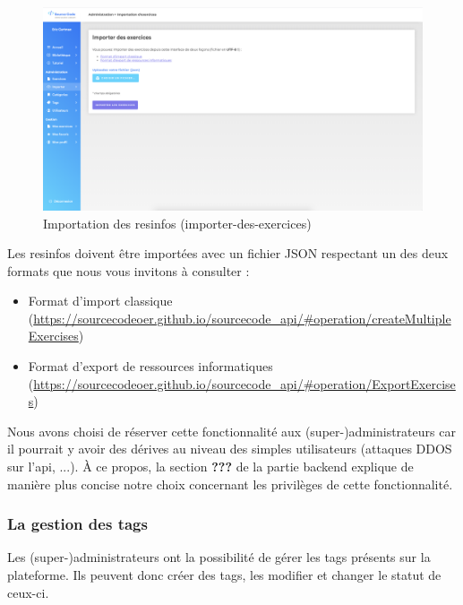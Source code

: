 \begin{figure}[H]
    \includegraphics[width=\textwidth,height=\textheight,keepaspectratio]{images/client/import.png}
    \centering
    \caption[SourceCode : importation des \glspl{resinfo}]{Importation des \glspl{resinfo} (importer-des-exercices)}
\end{figure}

Les \glspl{resinfo} doivent être importées avec un fichier JSON respectant un des deux formats que nous vous invitons à consulter :

\begin{itemize}
    \item Format d'import classique (\url{https://sourcecodeoer.github.io/sourcecode_api/#operation/createMultipleExercises})
    \item Format d'export de ressources informatiques (\url{https://sourcecodeoer.github.io/sourcecode_api/#operation/ExportExercises})
\end{itemize}

Nous avons choisi de réserver cette fonctionnalité aux (super-)administrateurs car il pourrait y avoir des dérives au niveau des simples utilisateurs (attaques DDOS sur l'\gls{api}, ...). À ce propos, la section \textbf{???} de la partie backend explique de manière plus concise notre choix concernant les privilèges de cette fonctionnalité.

\subsubsection{La gestion des \glspl{tag}}
\label{section:tagAdmin}

Les (super-)administrateurs ont la possibilité de gérer les \glspl{tag} présents sur la plateforme. Ils peuvent donc créer des \glspl{tag}, les modifier et changer le statut de ceux-ci.\\

